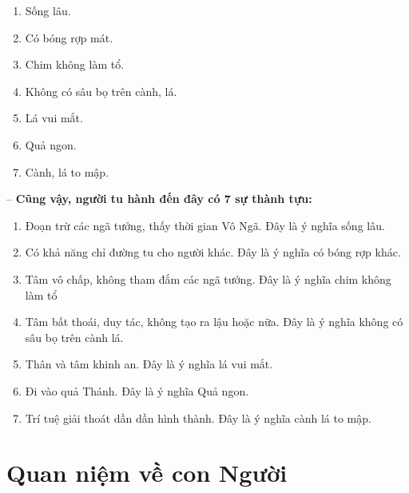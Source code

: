\begin{enumerate}[label=\itshape\arabic*\upshape/]

    \item Sống lâu.

    \item Có bóng rợp mát.

    \item Chim không làm tổ.

    \item Không có sâu bọ trên cành, lá.

    \item Lá vui mắt.

    \item Quả ngon.

    \item Cành, lá to mập.
\end{enumerate}

-- {\bf Cũng vậy, người tu hành đến đây có 7 sự thành tựu:}

\begin{enumerate}[label=\itshape\arabic*\upshape/]
    \item Đoạn trừ các ngã tưởng, thấy thời gian Vô Ngã. Đây là ý nghĩa sống lâu.

    \item Có khả năng chỉ đường tu cho người khác. Đây là ý nghĩa có bóng rợp khác.

    \item Tâm vô chấp, không tham đắm các ngã tướng. Đây là ý nghĩa chim không làm tổ

    \item Tâm bất thoái, duy tác, không tạo ra lậu hoặc nữa. Đây là ý nghĩa không có sâu bọ trên cành lá.

    \item Thân và tâm khinh an. Đây là ý nghĩa lá vui mắt.

    \item Đi vào quả Thánh. Đây là ý nghĩa Quả ngon.

    \item Trí tuệ giải thoát dần dần hình thành. Đây là ý nghĩa cành lá to mập.
\end{enumerate}

\section{Quan niệm về con Người} %
\label{sec:67_con_nguoi}

